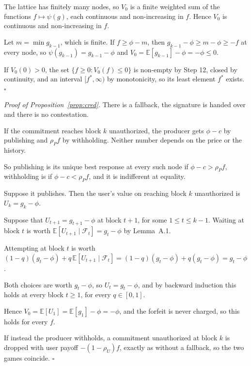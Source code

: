 \documentclass[11pt]{article}
\newcommand{\E}{\mathbb{E}}
\newenvironment{steps}{\begin{list}{}{\setlength{\leftmargin}{3.6em}\setlength{\labelwidth}{3.2em}\setlength{\labelsep}{0.4em}\setlength{\itemsep}{2pt}\setlength{\topsep}{3pt}\setlength{\parsep}{0pt}\renewcommand{\makelabel}[1]{##1\hfil}}}{\end{list}}
\begin{document}
\begin{steps}
\item[\emph{Step 11.}] The lattice has finitely many nodes, so $V_0$ is a finite weighted sum of the functions $f\mapsto\psi(g)$, each continuous and non-increasing in $f$. Hence $V_0$ is continuous and non-increasing in $f$.
\item[\emph{Step 12.}] Let $m=\min g_{k-1}$, which is finite. If $f\ge\phi-m$, then $g_{k-1}-\phi\ge m-\phi\ge-f$ at every node, so $\psi(g_{k-1})=g_{k-1}-\phi$ and $V_0=\E[g_{k-1}]-\phi=-\phi\le0$.
\item[\emph{Step 13.}] If $V_0(0)>0$, the set $\{f\ge0:V_0(f)\le0\}$ is non-empty by Step 12, closed by continuity, and an interval $[f^*,\infty)$ by monotonicity, so its least element $f^*$ exists. \hfill$\square$
\end{steps}

\emph{Proof of Proposition~\ref{prop:cred}.} There is a fallback, the signature is handed over and there is no contestation.
\begin{steps}
\item[\emph{Step 1.}] If the commitment reaches block $k$ unauthorized, the producer gets $\phi-c$ by publishing and $\rho_P f$ by withholding. Neither number depends on the price or the history.
\item[\emph{Step 2.}] So publishing is its unique best response at every such node if $\phi-c>\rho_P f$, withholding is if $\phi-c<\rho_P f$, and it is indifferent at equality.
\item[\emph{Step 3.}] Suppose it publishes. Then the user's value on reaching block $k$ unauthorized is $U_k=g_k-\phi$.
\item[\emph{Step 4.}] Suppose that $U_{t+1}=g_{t+1}-\phi$ at block $t+1$, for some $1\le t\le k-1$. Waiting at block $t$ is worth $\E[U_{t+1}\mid\mathcal F_t]=g_t-\phi$ by Lemma~A.1.
\item[\emph{Step 5.}] Attempting at block $t$ is worth $(1-q)(g_t-\phi)+q\,\E[U_{t+1}\mid\mathcal F_t]=(1-q)(g_t-\phi)+q(g_t-\phi)=g_t-\phi$.
\item[\emph{Step 6.}] Both choices are worth $g_t-\phi$, so $U_t=g_t-\phi$, and by backward induction this holds at every block $t\ge1$, for every $q\in[0,1]$.
\item[\emph{Step 7.}] Hence $V_0=\E[U_1]=\E[g_1]-\phi=-\phi$, and the forfeit is never charged, so this holds for every $f$.
\item[\emph{Step 8.}] If instead the producer withholds, a commitment unauthorized at block $k$ is dropped with user payoff $-(1-\rho_U)f$, exactly as without a fallback, so the two games coincide. \hfill$\square$
\end{steps}
\end{document}
